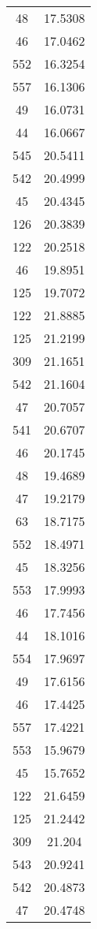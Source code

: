 \begin{tabular}[c]{|c|c|}
        48&   17.5308\\
        46&   17.0462\\
       552&   16.3254\\
       557&   16.1306\\
        49&   16.0731\\
        44&   16.0667\\
       545&   20.5411\\
       542&   20.4999\\
        45&   20.4345\\
       126&   20.3839\\
       122&   20.2518\\
        46&   19.8951\\
       125&   19.7072\\
       122&   21.8885\\
       125&   21.2199\\
       309&   21.1651\\
       542&   21.1604\\
        47&   20.7057\\
       541&   20.6707\\
        46&   20.1745\\
        48&   19.4689\\
        47&   19.2179\\
        63&   18.7175\\
       552&   18.4971\\
        45&   18.3256\\
       553&   17.9993\\
        46&   17.7456\\
        44&   18.1016\\
       554&   17.9697\\
        49&   17.6156\\
        46&   17.4425\\
       557&   17.4221\\
       553&   15.9679\\
        45&   15.7652\\
       122&   21.6459\\
       125&   21.2442\\
       309&    21.204\\
       543&   20.9241\\
       542&   20.4873\\
        47&   20.4748\\

\end{tabular}
